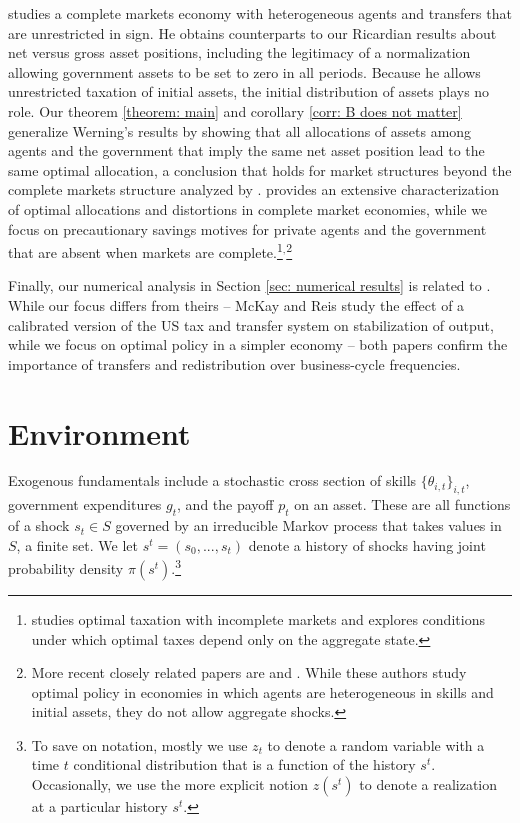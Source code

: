 \documentclass[thmsb,11pt]{article}
\begin{document}
\citet{Wer07a} studies a complete markets economy with heterogeneous agents
and transfers that are unrestricted in sign. He obtains counterparts to our Ricardian
results about net versus gross asset positions, including the legitimacy of a normalization allowing government
assets to be set to zero in all periods. Because he allows unrestricted
taxation of initial assets, the initial distribution of assets plays no
role. Our theorem \ref{theorem: main} and corollary \ref{corr: B does not matter}
generalize Werning's results by showing that all allocations of assets among
agents and the government that imply the same net asset position
lead to the same optimal allocation, a conclusion that holds for market
structures beyond the complete markets structure analyzed by \citeauthor{Wer07a}.
  \citet{Wer07a} provides an extensive
characterization of optimal allocations and distortions in complete market
economies, while we focus on precautionary savings motives for private
agents and the government that are absent when markets are complete.\footnote{%
\cite{Werning2012} studies optimal taxation with incomplete markets and explores
conditions under which optimal taxes depend only on the aggregate state.}$^,$\footnote{%
More recent closely related papers are \citet{Azzimonti2008,Azzimonti2008a} and \citet{Correia2010}. While these authors study optimal policy in
 economies in which agents are heterogeneous in skills and initial assets, they
  do not allow aggregate shocks.}

  Finally, our numerical analysis in Section \ref{sec: numerical results} is related to \citet{mckay2013}. While our focus differs from theirs -- McKay and Reis study the effect of a  calibrated version of the US tax and transfer system on stabilization of output, while we focus on optimal policy  in a  simpler economy -- both papers confirm the importance of transfers and redistribution over business-cycle frequencies.





\section{Environment}
\label{Sec: environment}

Exogenous fundamentals include a stochastic
cross section of skills $\{\theta_{i,t}\}_{i,t}$, government expenditures $g_t$,  and the payoff $p_t$ on an asset.
These  are all functions of a shock $s_{t}\in S$
governed by an irreducible Markov process that takes values in $S$, a finite set.
We let $s^{t}=\left(s_{0},...,s_{t}\right)$
denote a history of shocks having joint probability
 density $\pi(s^t)$.\footnote{To save on notation, mostly we use $z_{t}$ to denote a random variable
with a time $t$ conditional distribution that is a function of the
history $s^{t}$. Occasionally, we use the more explicit notion $z\left(s^{t}\right)$
to denote a realization at a particular history $s^{t}.$}
\end{document}
